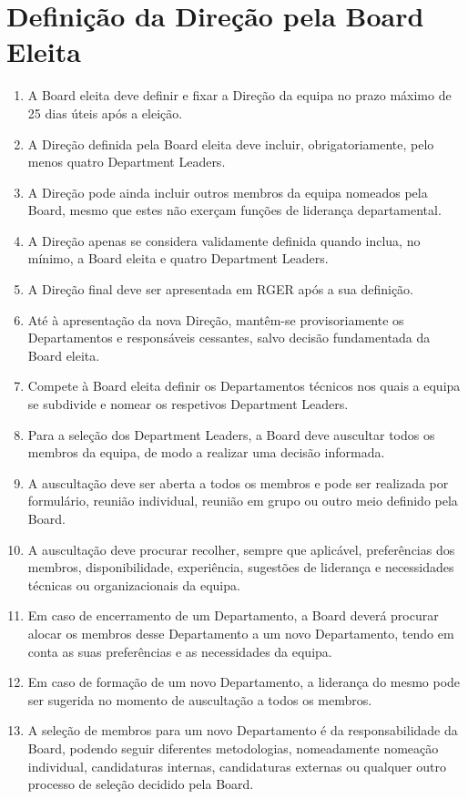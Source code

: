 \section{Definição da Direção pela Board Eleita}
\begin{enumerate}
  \item A Board eleita deve definir e fixar a Direção da equipa no prazo máximo de 25 dias úteis após a eleição.
  \item A Direção definida pela Board eleita deve incluir, obrigatoriamente, pelo menos quatro Department Leaders.
  \item A Direção pode ainda incluir outros membros da equipa nomeados pela Board, mesmo que estes não exerçam funções de liderança departamental.
  \item A Direção apenas se considera validamente definida quando inclua, no mínimo, a Board eleita e quatro Department Leaders.
  \item A Direção final deve ser apresentada em RGER após a sua definição.
  \item Até à apresentação da nova Direção, mantêm-se provisoriamente os Departamentos e responsáveis cessantes, salvo decisão fundamentada da Board eleita.
  \item Compete à Board eleita definir os Departamentos técnicos nos quais a equipa se subdivide e nomear os respetivos Department Leaders.
  \item Para a seleção dos Department Leaders, a Board deve auscultar todos os membros da equipa, de modo a realizar uma decisão informada.
  \item A auscultação deve ser aberta a todos os membros e pode ser realizada por formulário, reunião individual, reunião em grupo ou outro meio definido pela Board.
  \item A auscultação deve procurar recolher, sempre que aplicável, preferências dos membros, disponibilidade, experiência, sugestões de liderança e necessidades técnicas ou organizacionais da equipa.
  \item Em caso de encerramento de um Departamento, a Board deverá procurar alocar os membros desse Departamento a um novo Departamento, tendo em conta as suas preferências e as necessidades da equipa.
  \item Em caso de formação de um novo Departamento, a liderança do mesmo pode ser sugerida no momento de auscultação a todos os membros.
  \item A seleção de membros para um novo Departamento é da responsabilidade da Board, podendo seguir diferentes metodologias, nomeadamente nomeação individual, candidaturas internas, candidaturas externas ou qualquer outro processo de seleção decidido pela Board.

\end{enumerate}
